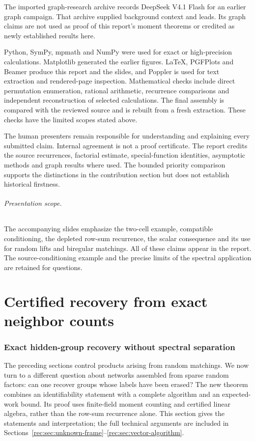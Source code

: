 \documentclass[11pt]{article}
\theoremstyle{definition}
\theoremstyle{remark}
\newcommand{\1}{\mathbf 1}
\begin{document}
The imported graph-research archive records DeepSeek V4.1 Flash for an earlier graph campaign. That archive supplied background context and leads. Its graph claims are not used as proof of this report's moment theorems or credited as newly established results here.

Python, SymPy, mpmath and NumPy were used for exact or high-precision calculations. Matplotlib generated the earlier figures. LaTeX, PGFPlots and Beamer produce this report and the slides, and Poppler is used for text extraction and rendered-page inspection. Mathematical checks include direct permutation enumeration, rational arithmetic, recurrence comparisons and independent reconstruction of selected calculations. The final assembly is compared with the reviewed source and is rebuilt from a fresh extraction. These checks have the limited scopes stated above.

The human presenters remain responsible for understanding and explaining every submitted claim. Internal agreement is not a proof certificate. The report credits the source recurrences, factorial estimate, special-function identities, asymptotic methods and graph results where used. The bounded priority comparison supports the distinctions in the contribution section but does not establish historical firstness.

\paragraph{Presentation scope.}
The accompanying slides emphasize the two-cell example, compatible conditioning, the depleted row-sum recurrence, the scalar consequence and its use for random lifts and biregular matchings. All of these claims appear in the report. The source-conditioning example and the precise limits of the spectral application are retained for questions.


\clearpage
\clearpage
\part{Certified recovery from exact neighbor counts}
\section{Exact hidden-group recovery without spectral separation}
\label{sec:recovery-overview}
The preceding sections control products arising from random matchings.
We now turn to a different question about networks assembled from sparse
random factors: can one recover groups whose labels have been erased?
The new theorem combines an identifiability statement with a complete
algorithm and an expected-work bound. Its proof uses finite-field moment
counting and certified linear algebra, rather than the row-sum recurrence
alone. This section gives the statements and interpretation; the full
technical arguments are included in Sections~\ref{rec:sec:unknown-frame}--\ref{rec:sec:vector-algorithm}.
\end{document}

